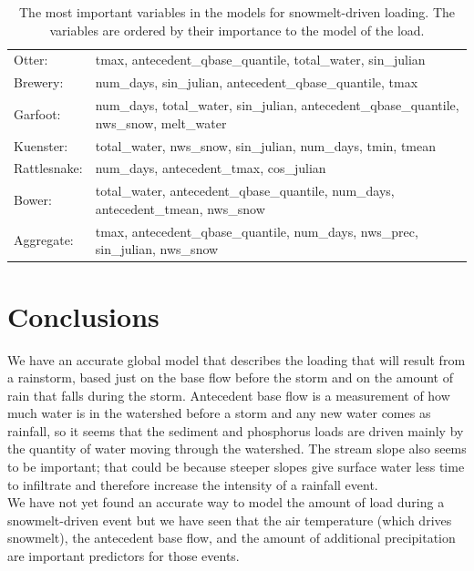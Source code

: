 \documentclass[10pt]{article}
\begin{document}
\begin{table}[h!]
\begin{center}
\begin{tabular}{ll}
        \hspace{5mm} Otter: & tmax, antecedent\_qbase\_quantile, total\_water, sin\_julian\\
        \hspace{5mm} Brewery: & num\_days, sin\_julian, antecedent\_qbase\_quantile, tmax\\
        \hspace{5mm} Garfoot: & num\_days, total\_water, sin\_julian, antecedent\_qbase\_quantile, nws\_snow, melt\_water\\
        \hspace{5mm} Kuenster: & total\_water, nws\_snow, sin\_julian, num\_days, tmin, tmean\\
        \hspace{5mm} Rattlesnake: & num\_days, antecedent\_tmax, cos\_julian\\
        \hspace{5mm} Bower: & total\_water, antecedent\_qbase\_quantile, num\_days, antecedent\_tmean, nws\_snow\\
        \hspace{5mm} Aggregate: & tmax, antecedent\_qbase\_quantile, num\_days, nws\_prec, sin\_julian, nws\_snow\\
    \end{tabular}
    \caption{The most important variables in the models for snowmelt-driven loading. The variables are ordered by their importance to the model of the load. \label{snow_predictor_list}}
    \end{center}
\end{table}

\section{Conclusions}
We have an accurate global model that describes the loading that will result from a rainstorm, based just on the base flow before the storm and on the amount of rain that falls during the storm. Antecedent base flow is a measurement of how much water is in the watershed before a storm and any new water comes as rainfall, so it seems that the sediment and phosphorus loads are driven mainly by the quantity of water moving through the watershed. The stream slope also seems to be important; that could be because steeper slopes give surface water less time to infiltrate and therefore increase the intensity of a rainfall event.\\

We have not yet found an accurate way to model the amount of load during a snowmelt-driven event but we have seen that the air temperature (which drives snowmelt), the antecedent base flow, and the amount of additional precipitation are important predictors for those events.\\
\end{document}
